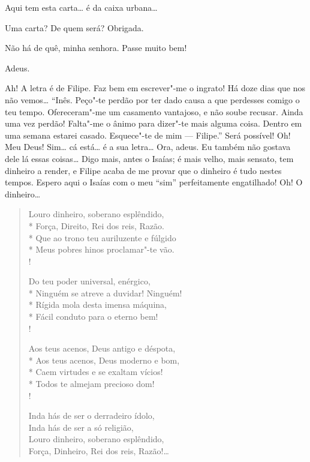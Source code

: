   Aqui tem esta carta\ldots{} é da caixa urbana\ldots{}

  Uma carta?  De quem será?
 Obrigada.

  Não há de quê, minha senhora. Passe muito bem!

 Adeus. 


\stagedir{\textsc{[Inês]}}

  Ah! A letra é de Filipe. Faz bem em escrever"-me o ingrato! Há doze
dias que nos não vemos\ldots{} 
“Inês.  Peço"-te perdão por ter dado causa a que perdesses comigo o teu tempo.
Ofereceram"-me um casamento vantajoso, e não soube recusar. Ainda uma vez perdão!
Falta"-me o ânimo para dizer"-te mais alguma coisa.
Dentro em uma semana estarei casado. Esquece"-te de mim --- Filipe.”
 Será possível! Oh! Meu Deus!  Sim\ldots{} cá
está\ldots{} é a sua letra\ldots{}  Ora, adeus. Eu também não gostava dele lá essas coisas\ldots{} Digo
mais, antes o
Isaías; é mais velho, mais sensato, tem dinheiro a render, e Filipe acaba de me
provar que o dinheiro é tudo nestes tempos. Espero aqui o Isaías com o meu “sim”
perfeitamente engatilhado! Oh! O dinheiro\ldots{}

\begin{verse} 
Louro dinheiro, soberano esplêndido,\\*
Força, Direito, Rei dos reis, Razão.\\*
Que ao trono teu auriluzente e fúlgido\\*
Meus pobres hinos proclamar"-te vão.\\! 

Do teu poder universal, enérgico,\\*
Ninguém se atreve a duvidar! Ninguém!\\*
Rígida mola desta imensa máquina,\\*
Fácil conduto para o eterno bem!\\!

Aos teus acenos, Deus antigo e déspota,\\*
Aos teus acenos, Deus moderno e bom,\\*
Caem virtudes e se exaltam vícios!\\*
Todos te almejam precioso dom!\\!

Inda hás de ser o derradeiro ídolo,\\
Inda hás de ser a só religião,\\
Louro dinheiro, soberano esplêndido,\\
Força, Dinheiro, Rei dos reis, Razão!\ldots{}
\end{verse}


